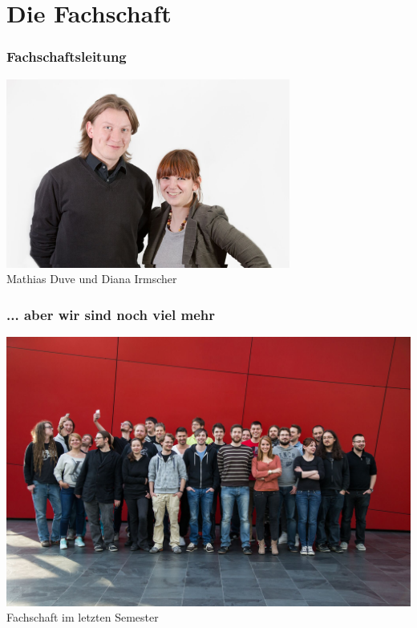 \documentclass{beamer}
\begin{document}
	\section{Die Fachschaft}
	
	\begin{frame}[t]
		\frametitle{Fachschaftsleitung}
		\center
		\includegraphics[width=0.7\textwidth]{matti_diana.jpg}
		\\Mathias Duve und Diana Irmscher
	\end{frame}
	
	\begin{frame}[t]
		\frametitle{... aber wir sind noch viel mehr}
		\center
		\includegraphics[width=1\textwidth]{fachschaft.jpg}
		\\Fachschaft im letzten Semester
	\end{frame}
	
\end{document}
